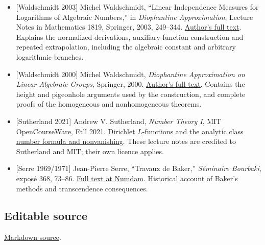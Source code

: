 \documentclass[
  11pt,
  a4paper,
]{article}
\providecommand{\tightlist}{%
  \setlength{\itemsep}{0pt}\setlength{\parskip}{0pt}}
\begin{document}
\begin{itemize}
\tightlist
\item
  {[}Waldschmidt 2003{]} Michel Waldschmidt, ``Linear Independence
  Measures for Logarithms of Algebraic Numbers,'' in \emph{Diophantine
  Approximation}, Lecture Notes in Mathematics 1819, Springer, 2003,
  249--344.
  \href{https://webusers.imj-prg.fr/~michel.waldschmidt/articles/pdf/SpringerLN1819-2003.pdf}{Author's
  full text}. Explains the normalized derivations, auxiliary-function
  construction and repeated extrapolation, including the algebraic
  constant and arbitrary logarithmic branches.
\item
  {[}Waldschmidt 2000{]} Michel Waldschmidt, \emph{Diophantine
  Approximation on Linear Algebraic Groups}, Springer, 2000.
  \href{https://webusers.imj-prg.fr/~michel.waldschmidt/articles/pdf/dalag.pdf}{Author's
  full text}. Contains the height and pigeonhole arguments used by the
  construction, and complete proofs of the homogeneous and
  nonhomogeneous theorems.
\item
  {[}Sutherland 2021{]} Andrew V. Sutherland, \emph{Number Theory I},
  MIT OpenCourseWare, Fall 2021.
  \href{https://ocw.mit.edu/courses/18-785-number-theory-i-fall-2021/mit18_785f21_lec18.pdf}{Dirichlet
  \(L\)-functions} and
  \href{https://ocw.mit.edu/courses/18-785-number-theory-i-fall-2021/mit18_785f21_lec19.pdf}{the
  analytic class number formula and nonvanishing}. These lecture notes
  are credited to Sutherland and MIT; their own licence applies.
\item
  {[}Serre 1969/1971{]} Jean-Pierre Serre, ``Travaux de Baker,''
  \emph{Séminaire Bourbaki}, exposé 368, 73--86.
  \href{https://www.numdam.org/item/SB_1969-1970__12__73_0.pdf}{Full
  text at Numdam}. Historical account of Baker's methods and
  transcendence consequences.
\end{itemize}

\subsection{Editable source}\label{editable-source}

\href{https://kokunoyumeto.github.io/open-math-courses-public/courses/TR-BAKER/src/TR-BAKER-03.md}{Markdown source}.
\end{document}
